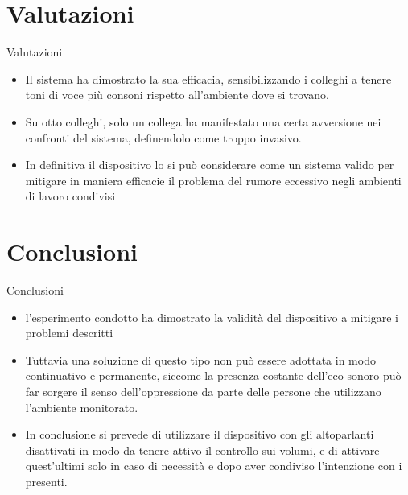 \documentclass[hidelinks,aspectratio=169]{beamer}
\begin{document}
\section{Valutazioni}
\begin{frame}{Valutazioni}
	\begin{itemize}
		\item Il sistema ha dimostrato la sua efficacia, sensibilizzando i colleghi a tenere toni di voce più consoni rispetto all'ambiente dove si trovano. 
		\item Su otto colleghi, solo un collega ha manifestato una certa avversione nei confronti del sistema, definendolo come troppo invasivo.
		\item In definitiva il dispositivo lo si può considerare come un sistema valido per mitigare in maniera efficacie il problema del rumore eccessivo negli ambienti di lavoro condivisi
	\end{itemize}
\end{frame}

\section{Conclusioni}
\begin{frame}{Conclusioni}
	\begin{itemize}
		\item l'esperimento condotto ha dimostrato la validità del dispositivo a mitigare i problemi descritti
		\item Tuttavia una soluzione di questo tipo non può essere adottata in modo continuativo e permanente, siccome la presenza costante dell'eco sonoro può far sorgere il senso dell'oppressione da parte delle persone che utilizzano l'ambiente monitorato.
		\item In conclusione si prevede di utilizzare il dispositivo con gli altoparlanti disattivati in modo da tenere attivo il controllo sui volumi, e di attivare quest'ultimi solo in caso di necessità e dopo aver condiviso l'intenzione con i presenti.
	\end{itemize}
\end{frame}
	
\end{document}
